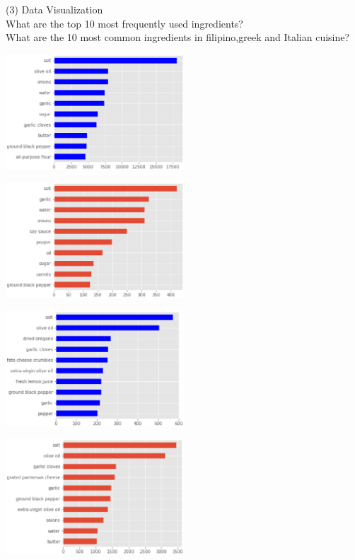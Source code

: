 (3) Data  Visualization\\What are the top 10 most frequently used ingredients?\\ What are the 10 most common ingredients in filipino,greek and Italian cuisine?
\begin{center}
  \begin{minipage}{0.5\linewidth}
    \centering
    \includegraphics[width=0.5\textwidth]{pic01/cooking.eps}
  \end{minipage}
  
  \begin{minipage}{0.5\linewidth}
    \centering
    \includegraphics[width=0.5\textwidth]{pic01/filipino.eps}
  \end{minipage}
  
  \begin{minipage}{0.5\linewidth}
    \centering
      \includegraphics[width=0.5\textwidth]{pic01/greek.eps}
  \end{minipage}
  \begin{minipage}{0.5\linewidth}
    \centering
      \includegraphics[width=0.5\textwidth]{pic01/italian.eps}
  \end{minipage}
  \hfill
\end{center}


